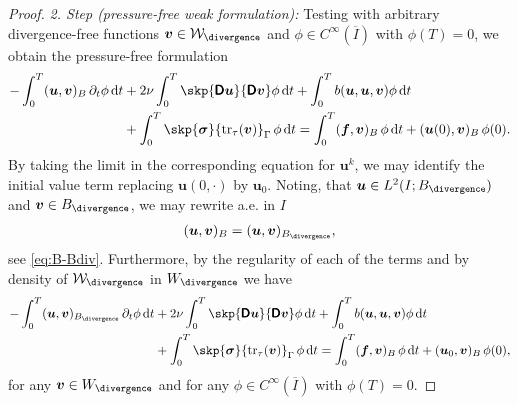 \documentclass[reqno,a4paper]{amsart}
\def\tens#1{\pmb{\mathsf{#1}}}
\def\vec#1{\boldsymbol{#1}}
\def\tr{\mathop{\mathrm{tr}}\nolimits}
\def\d{{\rm d}}
\def\dt{\,\d t}
\def\Bspace{B}
\def\Bdiv{{B_{\divergence}}}
\def\Wdiv{{W_{\divergence}}}
\def\bf{\vec{f}}
\def\bu{\vec{u}}
\def\bv{\vec{v}}
\def\bsigma{\vec{\sigma}}
\def\BD{\tens{D}}
\begin{document}
\begin{proof}
	\textit{2. Step (pressure-free weak formulation):}
	Testing with arbitrary divergence-free functions $\bv \in \mathcal{W}_{\divergence}$ and $\phi \in C^{\infty}(\overline I)$ with $\phi(T) = 0$, we obtain the pressure-free formulation 
	\begin{equation}\label{eq:unst-lim-distr-2}
		\begin{aligned}
			- \int_0^T ( \bu, \bv)_{B}\, \partial_t \phi \dt  
			&+ 2 \nu \int_{0}^T \skp{\BD \bu}{ \BD \bv} \phi \dt 
			+ \int_0^T b(\bu,\bu,\bv) \phi \dt 
			\\
			& + \int_{0}^T \skp{
				\bsigma
			}{\tr_\tau(\bv)}_{\Gamma} \, \phi \dt  = \int_{0}^T (\bf, {\bv})_B\, \phi  \dt + (\bu(0),  \bv)_B \, \phi(0).
		\end{aligned}
	\end{equation}
 By taking the limit in the corresponding equation for $\bu^k$, we may identify the initial value term replacing $\bu(0,\cdot)$ by $\bu_0$.  
	Noting, that $ \bu \in L^2(I;\Bdiv)$ and $ \bv \in \Bdiv$, we may rewrite a.e. in $I$ 
	\begin{align}
		( \bu, \bv)_{\Bspace}  = ( \bu, \bv)_{\Bdiv},
	\end{align}
	see \eqref{eq:B-Bdiv}. 
	Furthermore, by the regularity of each of the terms and by density of $\mathcal{W}_{\divergence}$ in $\Wdiv$ we have 
	\begin{equation}\label{eq:unst-lim-distr-3}
		\begin{aligned}
			- \int_0^T ( \bu, \bv)_{\Bdiv}\, \partial_t \phi \dt  
			&+ 2 \nu \int_{0}^T \skp{\BD \bu}{  \BD \bv} \phi \dt 
			+ \int_0^T b(\bu,\bu,\bv) \phi \dt 
			\\
			& + \int_{0}^T \skp{\bsigma}{\tr_\tau(\bv)}_{\Gamma} \,\phi \dt  = \int_{0}^T ( \bf, {\bv})_B\, \phi \dt + (\bu_0,  \bv)_B \, \phi(0),
		\end{aligned}
	\end{equation}
	for any $\bv \in \Wdiv$ and for any $\phi \in C^{\infty}(\overline I)$ with $\phi(T) = 0$. 
	

\end{proof}
\end{document}
